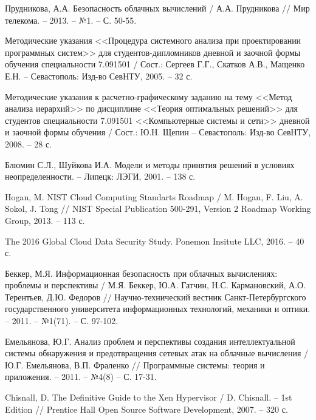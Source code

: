 \begingroup
\renewcommand{\section}[2]{\anonsection{СПИСОК ИСПОЛЬЗОВАННЫХ ИСТОЧНИКОВ}}
\begin{thebibliography}{00}

    Прудникова, А.А.
    Безопасность облачных вычислений /
    А.А. Прудникова //
    Мир телекома. -- 2013. -- №1. -- С. 50-55.

    Методические указания <<Процедура системного анализа при проектировании программных систем>>
    для студентов-дипломников дневной и заочной формы обучения специальности 7.091501 /
    Сост.: Сергеев Г.Г., Скатков А.В., Мащенко Е.Н. -- Севастополь:
    Изд-во СевНТУ, 2005. -- 32 с.

    Методические указания к расчетно-графическому заданию
    на тему <<Метод анализа иерархий>>  по дисциплине <<Теория оптимальных решений>>
    для студентов специальности 7.091501 <<Компьютерные системы и сети>>
    дневной и заочной формы обучения /
    Сост.: Ю.Н. Щепин -- Севастополь:
    Изд-во СевНТУ, 2008. -- 28 с.

    Блюмин С.Л., Шуйкова И.А.
    Модели и методы принятия решений в условиях неопределенности. --
    Липецк: ЛЭГИ, 2001. -- 138 с.

    Hogan, M.
    NIST Cloud Computing Standarts Roadmap /
    M. Hogan, F. Liu, A. Sokol, J. Tong //
    NIST Special Publication 500-291, Version 2
    Roadmap Working Group, 2013. -- 113 с.

    The 2016 Global Cloud Data Security Study.
    Ponemon Insitute LLC, 2016. -- 40 с.

    Беккер, М.Я.
    Информационная безопасность при облачных вычислениях: проблемы и перспективы /
    М.Я. Беккер, Ю.А. Гатчин, Н.С. Кармановский, А.О. Терентьев, Д.Ю. Федоров //
    Научно-технический вестник Санкт-Петербургского государственного университета информационных технологий, механики и оптики. -- 2011. -- №1(71). -- С. 97-102.

    Емельянова, Ю.Г.
    Анализ проблем и перспективы создания интеллектуальной системы обнаружения и предотвращения сетевых атак на облачные вычисления /
    Ю.Г. Емельянова, В.П. Фраленко //
    Программные системы: теория и приложения. -- 2011. -- №4(8) -- С. 17-31.

    Chisnall, D.
    The Definitive Guide to the Xen Hypervisor /
    D. Chisnall. --
    1st Edition //
    Prentice Hall Open Source Software Development, 2007. -- 320 с.


\end{thebibliography}
